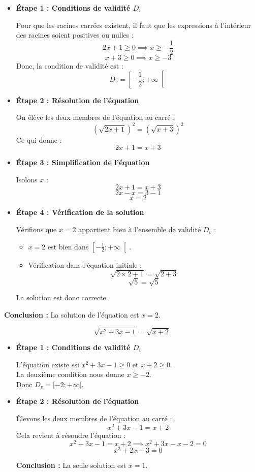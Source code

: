 \documentclass[12pt,a4paper]{article}
\newcounter{solution}
\begin{document}
\begin{itemize}
    \item \textbf{Étape 1 : Conditions de validité $D_v$}
    
    Pour que les racines carrées existent, il faut que les expressions à l'intérieur des racines soient positives ou nulles :
    \[
    2x + 1 \geq 0 \implies x \geq -\frac{1}{2}
    \]
    \[
    x + 3 \geq 0 \implies x \geq -3
    \]
    Donc, la condition de validité est :
    \[
    D_v = \left[-\frac{1}{2}; +\infty \right[
    \]
    
    \item \textbf{Étape 2 : Résolution de l'équation}
    
    On élève les deux membres de l'équation au carré :
    \[
    (\sqrt{2x + 1})^2 = (\sqrt{x + 3})^2
    \]
    Ce qui donne :
    \[
    2x + 1 = x + 3
    \]
    
    \item \textbf{Étape 3 : Simplification de l'équation}
    
    Isolons $x$ :
    \[
    2x + 1 = x + 3
    \]
    \[
    2x - x = 3 - 1
    \]
    \[
    x = 2
    \]
    
    \item \textbf{Étape 4 : Vérification de la solution}
    
    Vérifions que $x = 2$ appartient bien à l'ensemble de validité $D_v$ :
    
    \begin{itemize}
        \item $x = 2$ est bien dans $\left[-\frac{1}{2}; +\infty \right[$.
        \item Vérification dans l'équation initiale :
        \[
        \sqrt{2 \times 2 + 1} = \sqrt{2 + 3}
        \]
        \[
        \sqrt{5} = \sqrt{5}
        \]
    \end{itemize}
    
    La solution est donc correcte.
    
\end{itemize}

\textbf{Conclusion :} La solution de l'équation est $x = 2$.

\[
\sqrt{x^2 + 3x - 1} = \sqrt{x + 2}
\]

\begin{itemize}
    \item \textbf{Étape 1 : Conditions de validité $D_v$}
    
    L'équation existe ssi $x^2 + 3x - 1 \geq 0$ et $x + 2 \geq 0$.\\
    La deuxième condition nous donne $x \geq -2$.\\
    Donc $D_v = [-2; +\infty[$.
    
    \item \textbf{Étape 2 : Résolution de l'équation}
    
    Élevons les deux membres de l'équation au carré :
    \[
    x^2 + 3x - 1 = x + 2
    \]
    Cela revient à résoudre l'équation :
    \[
    x^2 + 3x - 1 = x + 2 \implies x^2 + 3x - x - 2 = 0
    \]
    \[
    x^2 + 2x - 3 = 0
    \]
    
    \textbf{Conclusion :} La seule solution est $x = 1$.
\end{itemize}
\end{document}
